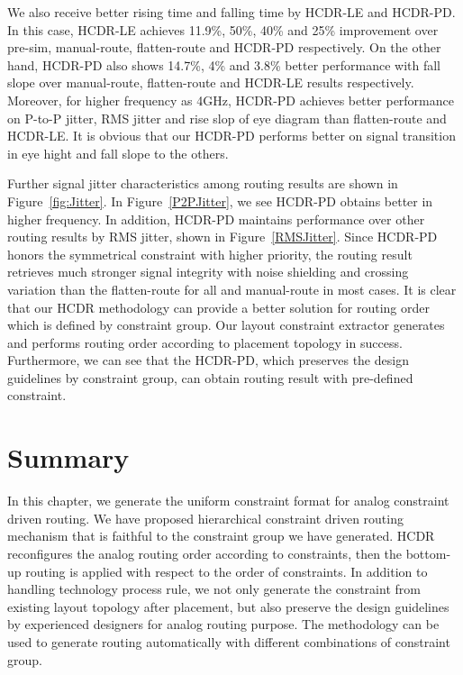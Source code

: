     We also receive better rising time and falling time by HCDR-LE and HCDR-PD. In this case, HCDR-LE achieves 11.9\%, 50\%, 40\% and 25\% improvement over pre-sim, manual-route, flatten-route and HCDR-PD respectively. On the other hand, HCDR-PD also shows 14.7\%, 4\% and 3.8\% better performance with fall slope over manual-route, flatten-route and HCDR-LE results respectively. Moreover, for higher frequency as 4GHz, HCDR-PD achieves better performance on P-to-P jitter, RMS jitter and rise slop of eye diagram than flatten-route and HCDR-LE. It is obvious that our HCDR-PD performs better on signal transition in eye hight and fall slope to the others. 
    
    Further signal jitter characteristics among routing results are shown in Figure~\ref{fig:Jitter}. In Figure~\ref{P2PJitter}, we see HCDR-PD obtains better in higher frequency. In addition, HCDR-PD maintains performance over other routing results by RMS jitter, shown in Figure~\ref{RMSJitter}. Since HCDR-PD honors the symmetrical constraint with higher priority, the routing result retrieves much stronger signal integrity with noise shielding and crossing variation than the flatten-route for all and manual-route in most cases. It is clear that our HCDR methodology can provide a better solution for routing order which is defined by constraint group. Our layout constraint extractor generates and performs routing order according to placement topology in success. Furthermore, we can see that the HCDR-PD, which preserves the design guidelines by constraint group, can obtain routing result with pre-defined constraint.

  \section{Summary}\label{sec:CUCLMSum}

    In this chapter, we generate the uniform constraint format for analog constraint driven routing. We have proposed hierarchical constraint driven routing mechanism that is faithful to the constraint group we have generated. HCDR reconfigures the analog routing order according to constraints, then the bottom-up routing is applied with respect to the order of constraints. In addition to handling technology process rule, we not only generate the constraint from existing layout topology after placement, but also preserve the design guidelines by experienced designers for analog routing purpose. The methodology can be used to generate routing automatically with different combinations of constraint group. 

